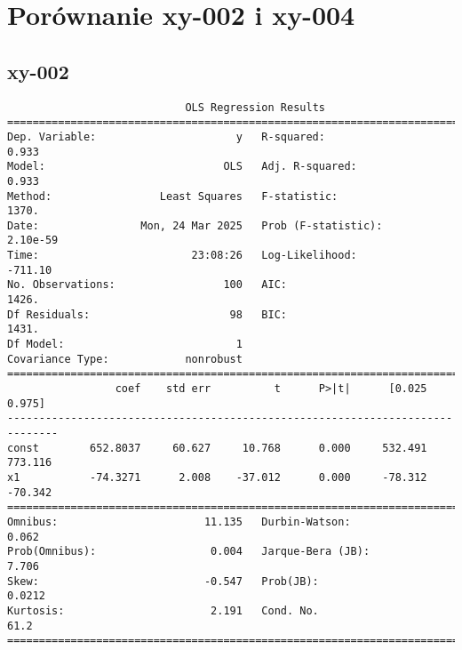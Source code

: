\documentclass{article}
\begin{document}
\section{Porównanie xy-002 i xy-004}

\subsection{xy-002}
\begin{verbatim}
                            OLS Regression Results                            
==============================================================================
Dep. Variable:                      y   R-squared:                       0.933
Model:                            OLS   Adj. R-squared:                  0.933
Method:                 Least Squares   F-statistic:                     1370.
Date:                Mon, 24 Mar 2025   Prob (F-statistic):           2.10e-59
Time:                        23:08:26   Log-Likelihood:                -711.10
No. Observations:                 100   AIC:                             1426.
Df Residuals:                      98   BIC:                             1431.
Df Model:                           1                                         
Covariance Type:            nonrobust                                         
==============================================================================
                 coef    std err          t      P>|t|      [0.025      0.975]
------------------------------------------------------------------------------
const        652.8037     60.627     10.768      0.000     532.491     773.116
x1           -74.3271      2.008    -37.012      0.000     -78.312     -70.342
==============================================================================
Omnibus:                       11.135   Durbin-Watson:                   0.062
Prob(Omnibus):                  0.004   Jarque-Bera (JB):                7.706
Skew:                          -0.547   Prob(JB):                       0.0212
Kurtosis:                       2.191   Cond. No.                         61.2
==============================================================================    
\end{verbatim}
\end{document}
